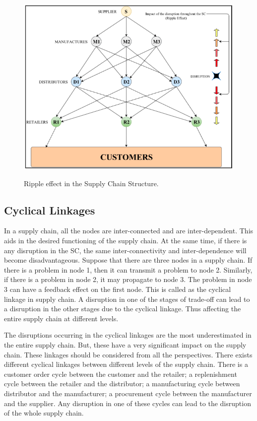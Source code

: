 \begin{figure}[H]
  \centering
  \includegraphics[width=6.0in]{figures/pdf/Ripple-effect.png}\\
  \caption{Ripple effect in the Supply Chain Structure.}\label{Ripple effect}
\end{figure}

\subsection{Cyclical Linkages}

In a supply chain, all the nodes are inter-connected and are inter-dependent. This aids in the desired functioning of the supply chain. At the same time, if there is any disruption in the SC, the same inter-connectivity and inter-dependence will become disadvantageous. Suppose that there are three nodes in a supply chain. If there is a problem in node 1, then it can transmit a problem to node 2. Similarly, if there is a problem in node 2, it may propagate to node 3. The problem in node 3 can have a feedback effect on the first node. This is called as the cyclical linkage in supply chain. A disruption in one of the stages of trade-off can lead to a disruption in the other stages due to the cyclical linkage. Thus affecting the entire supply chain at different levels.

The disruptions occurring in the cyclical linkages are the most underestimated in the entire supply chain. But, these have a very significant impact on the supply chain. These linkages should be considered from all the perspectives. There exists different cyclical linkages between different levels of the supply chain. There is a customer order cycle between the customer and the retailer; a replenishment cycle between the retailer and the distributor; a manufacturing cycle between distributor and the manufacturer; a procurement cycle between the manufacturer and the supplier. Any disruption in one of these cycles can lead to the disruption of the whole supply chain. 

